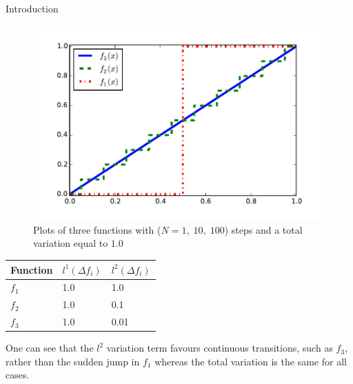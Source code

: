 \begin{chapter}{Introduction}
\begin{figure}[h!]
        \centering
	    \includegraphics[width=0.9\linewidth]{./figures/introduction/tv12comparison.pdf}
	\caption[Comparison total variation]{Plots of three functions with ($N=1,\;10,\;100$) steps and a total variation equal to $1.0$}
	\label{fig:tv12comparison}
\end{figure}
\begin{table}[h!]
\centering
\begin{tabular}{|l|l|l|}
    \hline
    \textbf{Function} & $l^1(\Delta f_i)$ & $l^2(\Delta f_i)$ \\
    \hline
    $f_1$ & 1.0 & 1.0 \\
    $f_2$ & 1.0 & 0.1 \\
    $f_3$ & 1.0 & 0.01 \\
    \hline
\end{tabular}
\end{table}

One can see that the $l^2$ variation term favours continuous transitions, such as $f_3$, rather than the sudden jump in $f_1$ whereas the total variation is the same for
all cases.



\end{chapter}
